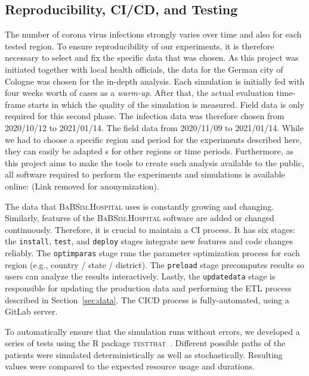 \documentclass[conference]{IEEEtran}
\newcommand{\babsimhospital}{\textsc{BaBSim.Hospital}\xspace}
\begin{document}
\subsection{Reproducibility, CI/CD, and Testing}\label{sec:reproduce}

The number of corona virus infections strongly varies over time and also for each tested region. 
To ensure reproducibility of our experiments, it is therefore necessary to select and fix the specific data that was chosen.
As this project was initiated together with local health officials, the data for the German city of Cologne was chosen for the in-depth analysis.
Each simulation is initially fed with four weeks worth of cases as a \emph{warm-up}. 
After that, the actual evaluation time-frame starts in which the quality of the simulation is measured. 
Field data is only required for this  second phase.
The infection data was therefore chosen from 2020/10/12 to 2021/01/14.
The field data from 2020/11/09 to 2021/01/14.
While we had to choose a specific region and period for the experiments described here, they can easily be adapted s for other regions or time periods.
Furthermore, as this project aims to make the tools to create such analysis available to the public, all software required to perform the experiments and simulations is available online: (Link removed for anonymization).

The data that \babsimhospital uses is constantly growing and changing.
Similarly, features of the \babsimhospital software are added or changed continuously.
Therefore, it is crucial to maintain a \gls{CI} process. 
It has six stages: the \texttt{install}, \texttt{test}, and \texttt{deploy} stages integrate new features and code changes reliably.
The \texttt{optimparas} stage runs the parameter optimization process for each region (e.g., country / state / district).
The \texttt{preload} stage precomputes results so users can analyze the results interactively. 
Lastly, the \texttt{updatedata} stage is responsible for updating the production data and performing the \gls{ETL} process described in Section~\ref{sec:data}.
The \gls{CICD} process is fully-automated, using a GitLab server.

To automatically ensure that the simulation runs without errors, we developed a series of tests using the R package \textsc{testthat}~\citep{Wick11a}. 
Different possible paths of the patients were simulated deterministically as well as stochastically. 
Resulting values were compared to the expected resource usage and durations.
\end{document}

